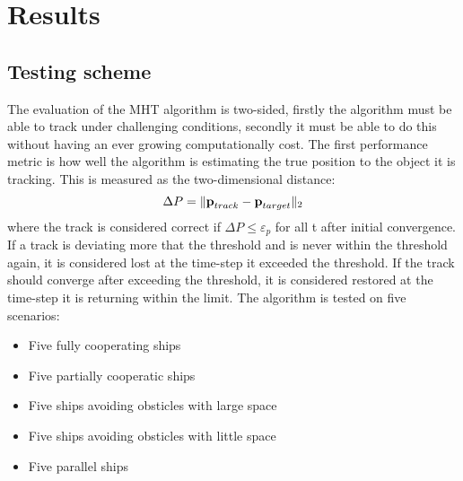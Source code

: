 \section{Results}
\label{sec:results}

\subsection{Testing scheme}
The evaluation of the MHT algorithm is two-sided, firstly the algorithm must be able to track under challenging conditions, secondly it must be able to do this without having an ever growing computationally cost. The first performance metric is how well the algorithm is estimating the true position to the object it is tracking. This is measured as the two-dimensional distance:
\begin{equation}
	\Delta P = \| \boldsymbol{\mathbf{p}}_{track}-\boldsymbol{\mathbf{p}}_{target} \|_2
\end{equation}
where the track is considered correct if $\Delta P \leq	\varepsilon_p$ for all t after initial convergence. If a track is deviating more that the threshold and is never within the threshold again, it is considered lost at the time-step it exceeded the threshold. If the track should converge after exceeding the threshold, it is considered restored at the time-step it is returning within the limit. The algorithm is tested on five scenarios:
\begin{itemize}
	\item Five fully cooperating ships
    \item Five partially cooperatic ships
    \item Five ships avoiding obsticles with large space
    \item Five ships avoiding obsticles with little space
	\item Five parallel ships
\end{itemize}

